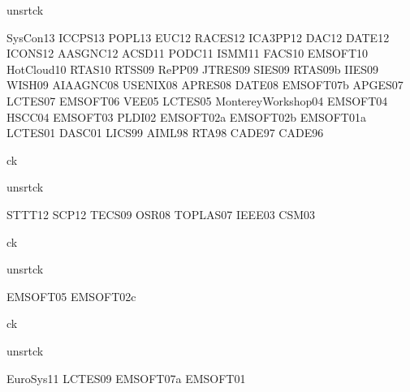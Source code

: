 {unsrtck}

\nocite{conferences}{SysCon13}
\nocite{conferences}{ICCPS13}
\nocite{conferences}{POPL13}
\nocite{conferences}{EUC12}
\nocite{conferences}{RACES12}
\nocite{conferences}{ICA3PP12}
\nocite{conferences}{DAC12}
\nocite{conferences}{DATE12}
\nocite{conferences}{ICONS12}
\nocite{conferences}{AASGNC12}
\nocite{conferences}{ACSD11}
\nocite{conferences}{PODC11}
\nocite{conferences}{ISMM11}
\nocite{conferences}{FACS10}
\nocite{conferences}{EMSOFT10}
\nocite{conferences}{HotCloud10}
\nocite{conferences}{RTAS10}
\nocite{conferences}{RTSS09}
\nocite{conferences}{RePP09}
\nocite{conferences}{JTRES09}
\nocite{conferences}{SIES09}
\nocite{conferences}{RTAS09b}
\nocite{conferences}{IIES09}
\nocite{conferences}{WISH09}
\nocite{conferences}{AIAAGNC08}
\nocite{conferences}{USENIX08}
\nocite{conferences}{APRES08}
\nocite{conferences}{DATE08}
\nocite{conferences}{EMSOFT07b}
\nocite{conferences}{APGES07}
\nocite{conferences}{LCTES07}
\nocite{conferences}{EMSOFT06}
\nocite{conferences}{VEE05}
\nocite{conferences}{LCTES05}
\nocite{conferences}{MontereyWorkshop04}
\nocite{conferences}{EMSOFT04}
\nocite{conferences}{HSCC04}
\nocite{conferences}{EMSOFT03}
\nocite{conferences}{PLDI02}
\nocite{conferences}{EMSOFT02a}
\nocite{conferences}{EMSOFT02b}
\nocite{conferences}{EMSOFT01a}
\nocite{conferences}{LCTES01}
\nocite{conferences}{DASC01}
\nocite{conferences}{LICS99}
\nocite{conferences}{AIML98}
\nocite{conferences}{RTA98}
\nocite{conferences}{CADE97}
\nocite{conferences}{CADE96}

{ck}{}


{unsrtck}

\nocite{journals}{STTT12}
\nocite{journals}{SCP12}
\nocite{journals}{TECS09}
\nocite{journals}{OSR08}
\nocite{journals}{TOPLAS07}
\nocite{journals}{IEEE03}
\nocite{journals}{CSM03}

{ck}{}


{unsrtck}

\nocite{invited}{EMSOFT05}
\nocite{invited}{EMSOFT02c}

{ck}{}


{unsrtck}

\nocite{books}{EuroSys11}
\nocite{books}{LCTES09}
\nocite{books}{EMSOFT07a}
\nocite{books}{EMSOFT01}

